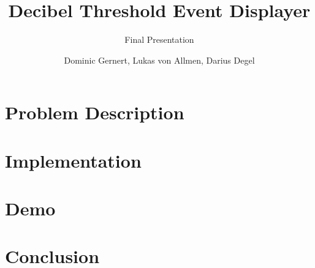 \documentclass[authorontitle=true]{bfhbeamer}
\title{Decibel Threshold Event Displayer}
\subtitle{Final Presentation}
\author{Dominic Gernert, Lukas von Allmen, Darius Degel}
\begin{document}
    \maketitle
    
    \section{Problem Description}\label{sec:problem-description}
    
    \section{Implementation}\label{sec:implementation}
    
    \section{Demo}\label{sec:demo}
    
    \section{Conclusion}\label{sec:conclusion}
    
\end{document}
